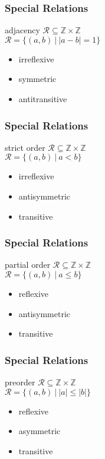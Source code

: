 \documentclass[dvipsnames]{beamer}
\begin{document}
\begin{frame}
  \frametitle{Special Relations}

  \begin{block}{adjacency}
    $\mathcal{R} \subseteq \mathbb{Z} \times \mathbb{Z}$\\
    $\mathcal{R} = \{(a,b)~|~|a-b|=1\}$
  \end{block}

  \medskip
  \begin{itemize}
    \item irreflexive
    \item symmetric
    \item antitransitive
  \end{itemize}
\end{frame}

\begin{frame}
  \frametitle{Special Relations}

  \begin{block}{strict order}
    $\mathcal{R} \subseteq \mathbb{Z} \times \mathbb{Z}$\\
    $\mathcal{R} = \{(a,b)~|~a<b\}$
  \end{block}

  \medskip
  \begin{itemize}
    \item irreflexive
    \item antisymmetric
    \item transitive
  \end{itemize}
\end{frame}

\begin{frame}
  \frametitle{Special Relations}

  \begin{block}{partial order}
    $\mathcal{R} \subseteq \mathbb{Z} \times \mathbb{Z}$\\
    $\mathcal{R} = \{(a,b)~|~ a \leq b\}$
  \end{block}

  \medskip
  \begin{itemize}
    \item reflexive
    \item antisymmetric
    \item transitive
  \end{itemize}
\end{frame}

\begin{frame}
  \frametitle{Special Relations}

  \begin{block}{preorder}
    $\mathcal{R} \subseteq \mathbb{Z} \times \mathbb{Z}$\\
    $\mathcal{R} = \{(a,b)~|~|a| \leq |b|\}$
  \end{block}

  \medskip
  \begin{itemize}
    \item reflexive
    \item asymmetric
    \item transitive
  \end{itemize}
\end{frame}
\end{document}
